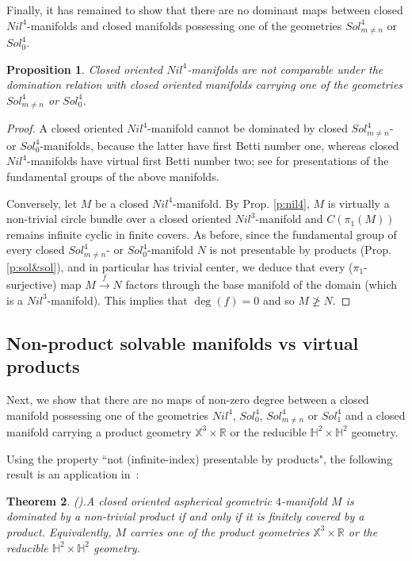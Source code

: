 \documentclass[12pt]{amsart}
\newtheorem{thm}{Theorem}[section]
\newtheorem{prop}[thm]{Proposition}
\theoremstyle{remark}
\begin{document}
Finally, it has remained to show that there are no dominant maps between closed $Nil^4$-manifolds and closed manifolds possessing one of the geometries
$Sol_{m \neq n}^4$ or $Sol_0^4$.

\begin{prop}
 Closed oriented $Nil^4$-manifolds are not comparable under the domination relation with closed oriented manifolds carrying one of the geometries
$Sol_{m \neq n}^4$ or $Sol_0^4$.
\end{prop}
\begin{proof}
 A closed oriented $Nil^4$-manifold cannot be dominated by closed
$Sol_{m \neq n}^4$- or $Sol_0^4$-manifolds, because the latter have first Betti number one, whereas closed $Nil^4$-manifolds have virtual first
Betti number two; see \cite[Section 6.3.3]{NeoIIPP} for presentations of the fundamental groups of the above manifolds.

Conversely, let $M$ be a closed $Nil^4$-manifold. By Prop. \ref{p:nil4}, $M$ is virtually a non-trivial circle bundle over a closed oriented
$Nil^3$-manifold and $C(\pi_1(M))$ remains infinite cyclic in finite covers. As before, since the fundamental group of every closed $Sol_{m \neq n}^4$- or $Sol_0^4$-manifold $N$
is not
presentable by products (Prop. \ref{p:sol&sol}), and in particular has trivial center, we deduce that every
($\pi_1$-surjective) map $M \stackrel{f}\longrightarrow N$ factors through the base manifold of the domain (which is a $Nil^3$-manifold). This implies that $\deg(f) = 0$ and so
$M \ngeq N$.
\end{proof}

\subsection{Non-product solvable manifolds vs virtual products}

Next, we show that there are no maps of non-zero degree between a closed manifold possessing one of the geometries $Nil^4$, $Sol_0^4$, $Sol_{m \neq n}^4$
or $Sol_1^4$ and a closed manifold carrying a product geometry $\mathbb{X}^3 \times {\mathbb{R}}$ or the reducible $\mathbb{H}^2 \times \mathbb{H}^2$ geometry.

Using the property ``not (infinite-index) presentable by products", the following result is an application in~\cite{NeoIIPP}:

\begin{thm}{\normalfont(\cite[Theorem F]{NeoIIPP}).}\label{t:productssolvable}
A closed oriented aspherical geometric $4$-manifold $M$ is dominated by a non-trivial product if and only if it is finitely covered by a product. Equivalently, $M$ carries one of the product geometries $\mathbb{X}^3 \times{\mathbb{R}}$ or the reducible $\mathbb{H}^2 \times \mathbb{H}^2$ geometry.
\end{thm}
\end{document}
